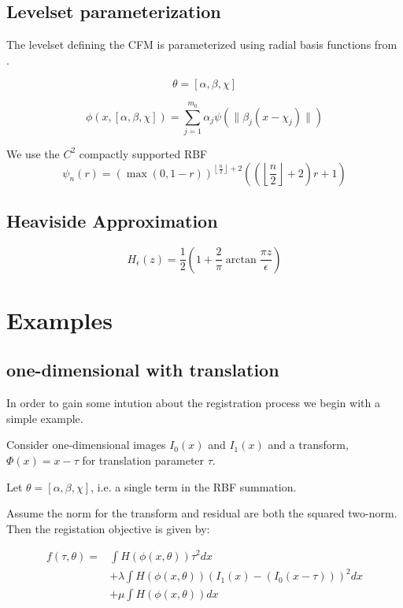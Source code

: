 \subsection{Levelset parameterization}
The levelset defining the CFM is parameterized using radial basis
functions from \cite{Aghasi2011}.

\[
\theta = [\alpha, \beta, \chi]
\] 

\[
\phi(x,[\alpha, \beta, \chi]) = \sum_{j = 1}^{m_0} \alpha_j
\psi(\|\beta_j(x - \chi_j)\|) 
\]

We use the $C^2$ compactly supported RBF
\[
\psi_{n}(r) = \left ( \max{\left ( 0,1 - r \right )} \right )^{\left\lfloor
  \frac{n}{2}\right\rfloor + 2}\left ( \left ( \left\lfloor
  \frac{n}{2}\right\rfloor + 2 \right ) r+1 \right ) 
\]

\subsection{Heaviside Approximation}

\[
H_\epsilon(z) = \frac{1}{2} \left (  1 + \frac{2}{\pi}
  \arctan{\frac{\pi z}{\epsilon}} \right )
\]

\section{Examples}

\subsection{one-dimensional with translation }
In order to gain some intution about the registration process we begin
with a simple example.
\par
Consider one-dimensional images $I_0(x)$ and $I_1(x)$ and a
transform, $\Phi(x) = x - \tau$ for translation parameter $\tau$.
\par
Let $\theta = [\alpha, \beta, \chi]$, i.e. a single term in the RBF
summation.
\par
Assume the norm for the transform and residual are both the squared two-norm.
Then the registation objective is given by:

\begin{eqnarray*}
f(\tau,\theta) = & \int H(\phi(x,\theta)) \tau^2 dx \\
& + \lambda \int H(\phi(x,\theta))\left (I_1(x) - (I_0(x-\tau)) \right )^2dx \\
& + \mu \int H(\phi(x,\theta)) dx
\end{eqnarray*}

